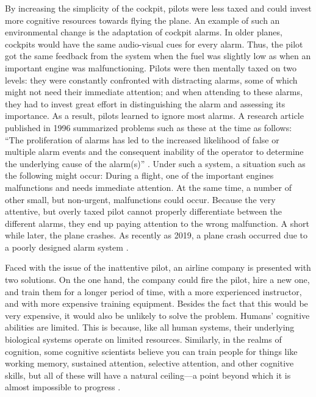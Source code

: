 \documentclass{article}
\begin{document}
By increasing the simplicity of the cockpit, pilots were less taxed and could invest more cognitive resources towards flying the plane. An example of such an environmental change is the adaptation of cockpit alarms. In older planes, cockpits would have the same audio-visual cues for every alarm. Thus, the pilot got the same feedback from the system when the fuel was slightly low as when an important engine was malfunctioning. Pilots were then mentally taxed on two levels: they were constantly confronted with distracting alarms, some of which might not need their immediate attention; and when attending to these alarms, they had to invest great effort in distinguishing the alarm and assessing its importance. As a result, pilots learned to ignore most alarms. A research article published in 1996 summarized problems such as these at the time as follows: “The proliferation of alarms has led to the increased likelihood of false or multiple alarm events and the consequent inability of the operator to determine the underlying cause of the alarm(s)” \parencite[pp. 12][undefined]{Gilson1996}. Under such a system, a situation such as the following might occur: During a flight, one of the important engines malfunctions and needs immediate attention. At the same time, a number of other small, but non-urgent, malfunctions could occur. Because the very attentive, but overly taxed pilot cannot properly differentiate between the different alarms, they end up paying attention to the wrong malfunction. A short while later, the plane crashes. As recently as 2019, a plane crash occurred due to a poorly designed alarm system \parencite{Levin2019}. 

Faced with the issue of the inattentive pilot, an airline company is presented with two solutions. On the one hand, the company could fire the pilot, hire a new one, and train them for a longer period of time, with a more experienced instructor, and with more expensive training equipment. Besides the fact that this would be very expensive, it would also be unlikely to solve the problem. Humans' cognitive abilities are limited. This is because, like all human systems, their underlying biological systems operate on limited resources. Similarly, in the realms of cognition, some cognitive scientists believe you can train people for things like working memory, sustained attention, selective attention, and other cognitive skills, but all of these will have a natural ceiling—a point beyond which it is almost impossible to progress \parencite{Kwok2011, Traut2021}. 
\end{document}
